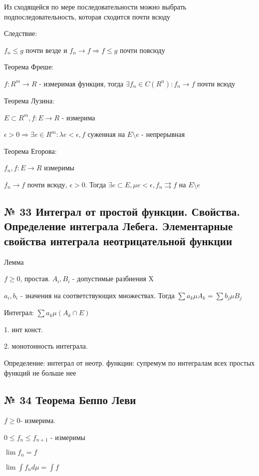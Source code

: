 \documentclass{article}
\begin{document}
Из сходящейся по мере последовательности можно выбрать подпоследовательность, которая сходится почти всюду

Следствие:

$f_n \leq g$ почти везде и $f_n \rightarrow	f \Rightarrow f \leq g$ почти повсюду

Теорема Фреше:

$f : R^m \rightarrow R$ - измеримая функция, тогда $\exists f_n \in C(R^n): f_n \rightarrow f$ почти всюду

Теорема Лузина:

$E\subset R^m, f : E \rightarrow R$ - измерима

$\epsilon > 0 \Rightarrow \exists e \in R^m : \lambda e < \epsilon, f$ суженная на $E \setminus e$ - непрерывная

Теорема Егорова:

$f_n, f : E \rightarrow R$ измеримы

$f_n \rightarrow f$ почти всюду, $\epsilon > 0$. Тогда $\exists e \subset E, \mu e < \epsilon, f_n \rightrightarrows f$ на $E \setminus e$

\subsection{ \footnotesize № 33 Интеграл от простой функции. Свойства. Определение интеграла Лебега. Элементарные свойства интеграла неотрицательной функции}

Лемма

$f \geq 0$, простая. $A_i, B_i$ - допустимые разбиения X

$a_i, b_i$ - значения на соответствующих множествах. Тогда $\sum{a_k\mu A_k} = \sum{b_j\mu B_j}$

Интеграл: $\sum{a_k \mu(A_k \cap E)}$

1. инт конст.

2. монотонность интеграла.

Определение: интеграл от неотр. функции: супремум по интегралам всех простых функций не больше нее

\subsection{ \footnotesize № 34 Теорема Беппо Леви}

$f \geq 0$- измерима.

$0 \leq f_n \leq f_{n + 1}$ - измеримы

$\lim{f_n} = f$

$\lim{\int{f_n d\mu}} = \int{f}$
\end{document}
